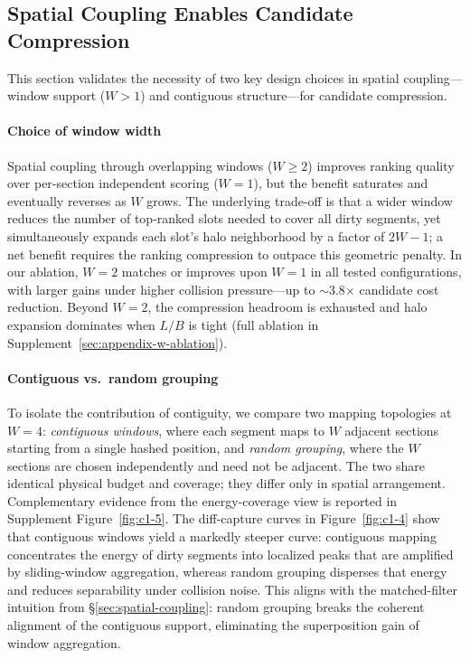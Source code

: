 \subsection{Spatial Coupling Enables Candidate Compression}
\label{sec:eval-spatial}

This section validates the necessity of two key design choices in spatial coupling---window support ($W>1$) and contiguous structure---for candidate compression.

\paragraph{Choice of window width}
Spatial coupling through overlapping windows ($W \ge 2$) improves ranking
quality over per-section independent scoring ($W{=}1$), but the benefit
saturates and eventually reverses as $W$ grows. The underlying trade-off
is that a wider window reduces the number of top-ranked slots needed to
cover all dirty segments, yet simultaneously expands each slot's halo
neighborhood by a factor of $2W{-}1$; a net benefit requires the ranking
compression to outpace this geometric penalty. In our ablation, $W{=}2$
matches or improves upon $W{=}1$ in all tested configurations, with
larger gains under higher collision pressure---up to $\sim$3.8$\times$
candidate cost reduction. Beyond $W{=}2$, the compression headroom is
exhausted and halo expansion dominates when $L/B$ is tight (full ablation
in Supplement~\ref{sec:appendix-w-ablation}).


\paragraph{Contiguous vs.\ random grouping}
To isolate the contribution of contiguity, we compare two
mapping topologies at $W{=}4$: \emph{contiguous windows},
where each segment maps to $W$ adjacent sections starting
from a single hashed position, and \emph{random grouping},
where the $W$ sections are chosen independently and need not
be adjacent. The two share identical physical budget and
coverage; they differ only in spatial arrangement.
Complementary evidence from the energy-coverage view is
reported in Supplement Figure~\ref{fig:c1-5}.
The diff-capture curves in Figure~\ref{fig:c1-4} show that
contiguous windows yield a markedly steeper curve: 
contiguous mapping concentrates the energy of dirty segments
into localized peaks that are amplified by sliding-window
aggregation, whereas random grouping disperses that energy
and reduces separability under collision noise.
This aligns with the
matched-filter intuition from \S\ref{sec:spatial-coupling}:
random grouping breaks the coherent alignment of the
contiguous support, eliminating the superposition gain of
window aggregation.

